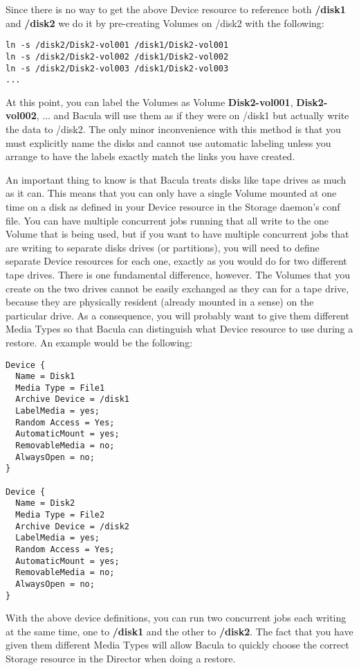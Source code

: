 Since there is no way to get the above Device resource to reference both {\bf
/disk1} and {\bf /disk2} we do it by pre-creating Volumes on /disk2 with the
following: 

\footnotesize
\begin{verbatim}
ln -s /disk2/Disk2-vol001 /disk1/Disk2-vol001
ln -s /disk2/Disk2-vol002 /disk1/Disk2-vol002
ln -s /disk2/Disk2-vol003 /disk1/Disk2-vol003
...
\end{verbatim}
\normalsize

At this point, you can label the Volumes as Volume {\bf Disk2-vol001}, {\bf
Disk2-vol002}, ... and Bacula will use them as if they were on /disk1 but
actually write the data to /disk2. The only minor inconvenience with this
method is that you must explicitly name the disks and cannot use automatic
labeling unless you arrange to have the labels exactly match the links you
have created. 

An important thing to know is that Bacula treats disks like tape drives
as much as it can. This means that you can only have a single Volume
mounted at one time on a disk as defined in your Device resource in
the Storage daemon's conf file.  You can have multiple concurrent 
jobs running that all write to the one Volume that is being used, but
if you want to have multiple concurrent jobs that are writing to
separate disks drives (or partitions), you will need to define 
separate Device resources for each one, exactly as you would do for
two different tape drives.  There is one fundamental difference, however.
The Volumes that you create on the two drives cannot be easily exchanged
as they can for a tape drive, because they are physically resident (already
mounted in a sense) on the particular drive.  As a consequence, you will
probably want to give them different Media Types so that Bacula can
distinguish what Device resource to use during a restore.
An example would be the following:

\footnotesize
\begin{verbatim}
Device {
  Name = Disk1
  Media Type = File1
  Archive Device = /disk1
  LabelMedia = yes;
  Random Access = Yes;
  AutomaticMount = yes;
  RemovableMedia = no;
  AlwaysOpen = no;
}

Device {
  Name = Disk2
  Media Type = File2
  Archive Device = /disk2
  LabelMedia = yes;
  Random Access = Yes;
  AutomaticMount = yes;
  RemovableMedia = no;
  AlwaysOpen = no;
}
\end{verbatim}
\normalsize

With the above device definitions, you can run two concurrent
jobs each writing at the same time, one to {\bf /disk1} and the
other to {\bf /disk2}.  The fact that you have given them different
Media Types will allow Bacula to quickly choose the correct
Storage resource in the Director when doing a restore.

